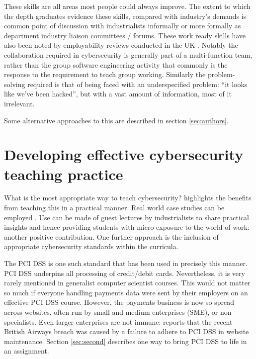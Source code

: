 \documentclass[conference]{IEEEtran}
\begin{document}
These skills are all areas most people could always improve. The extent to which the depth graduates evidence these skills, compared with industry's demands is common point of discussion with industrialists informally or more formally as department industry liaison committees / forums. These work ready skills have also been noted by employability reviews conducted in the UK \cite{shadbolt2016shadbolt,wakeham}. Notably the collaboration required in cybersecurity is generally part of a multi-function team, rather than the group software engineering activity that commonly is the response to the requirement to teach group working. Similarly the problem-solving required is that of being faced with an underspecified problem: ``it looks like we've been hacked'', but with a vast amount of information, most of it irrelevant.

Some alternative approaches to this are described in section \ref{sec:authors}.

\section{Developing effective cybersecurity teaching practice}\label{practice}

What is the most appropriate way to teach cybersecurity? \cite{Weiss:2013:THC:2527148.2527180} highlights the benefits from teaching this in a practical manner. Real world case studies can be employed \cite[e.g.]{BritishAirways2018a,Zoom2020a}. Use can be made of guest lectures by industrialists to share practical insights and hence providing students with micro-exposure to the world of work: another positive contribution. One further approach is the inclusion of appropriate cybersecurity standards within the curricula.

The PCI DSS \cite{PCI2018b} is one such standard that has been used in precisely this manner. PCI DSS underpins all processing of credit/debit cards. Nevertheless, it is very rarely mentioned in generalist computer scientist courses. This would not matter so much if everyone handling payments data were sent by their employers on an effective PCI DSS course. However, the payments business is now so spread across websites, often run by small and medium enterprises (SME), or non-specialists. Even larger enterprises are not immune: \cite{BritishAirways2018a} reports that the recent British Airways breach was caused by a failure to adhere to PCI DSS in website maintenance. Section \ref{sec:second} describes one way to bring PCI DSS to life in an assignment.
\end{document}
